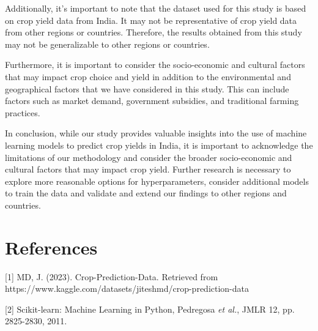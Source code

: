 \documentclass{article}
\begin{document}
Additionally, it's important to note that the dataset used for this study is based on crop yield data from India. It may not be representative of crop yield data from other regions or countries. Therefore, the results obtained from this study may not be generalizable to other regions or countries.

Furthermore, it is important to consider the socio-economic and cultural factors that may impact crop choice and yield in addition to the environmental and geographical factors that we have considered in this study. This can include factors such as market demand, government subsidies, and traditional farming practices.

In conclusion, while our study provides valuable insights into the use of machine learning models to predict crop yields in India, it is important to acknowledge the limitations of our methodology and consider the broader socio-economic and cultural factors that may impact crop yield. Further research is necessary to explore more reasonable options for hyperparameters, consider additional models to train the data and validate and extend our findings to other regions and countries.

\section*{References}

\small

[1] MD, J. (2023). Crop-Prediction-Data. Retrieved from https://www.kaggle.com/datasets/jiteshmd/crop-prediction-data

[2] Scikit-learn: Machine Learning in Python, Pedregosa {\it et al.}, JMLR 12, pp. 2825-2830, 2011.
\end{document}
